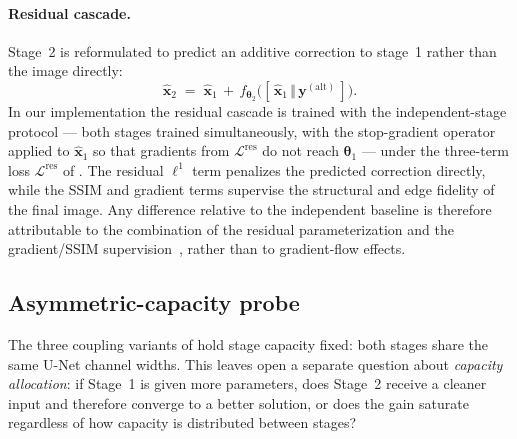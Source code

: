 \paragraph{Residual cascade.}
Stage~2 is reformulated to predict an additive correction to stage~1 rather than the image directly:
\begin{equation}
    \hat{\mathbf{x}}_{2} \;=\; \hat{\mathbf{x}}_{1}
        \,+\, f_{\boldsymbol{\theta}_{2}}\!\bigl([\,\hat{\mathbf{x}}_{1}\,\Vert\,\mathbf{y}^{(\mathrm{alt})}\,]\bigr).
    \label{eq:meth_residual}
\end{equation}
In our implementation the residual cascade is trained with the independent-stage protocol ---
both stages trained simultaneously, with the stop-gradient operator applied to
$\hat{\mathbf{x}}_{1}$ so that gradients from $\mathcal{L}^{\mathrm{res}}$ do not reach
$\boldsymbol{\theta}_1$ --- under the three-term loss
$\mathcal{L}^{\mathrm{res}}$ of . The residual $\ell^{1}$ term penalizes
the predicted correction directly, while the SSIM and gradient terms supervise the structural and
edge fidelity of the final image. Any difference relative to the independent baseline is therefore
attributable to the combination of the residual parameterization and the gradient/SSIM
supervision~\cite{Zhang2017, He2016}, rather than to gradient-flow effects.


\subsection{Asymmetric-capacity probe}
\label{subsec:meth_asymmetric}

The three coupling variants of  hold stage capacity fixed:
both stages share the same U-Net channel widths. This leaves open a separate question about
\emph{capacity allocation}: if Stage~1 is given more parameters, does Stage~2 receive a cleaner
input and therefore converge to a better solution, or does the gain saturate regardless of how
capacity is distributed between stages?

